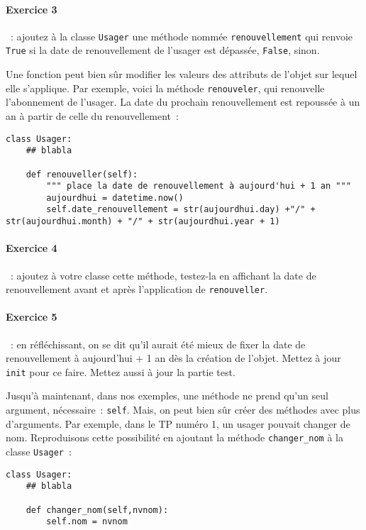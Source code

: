 \documentclass{article}
\begin{document}
\paragraph{Exercice 3}~: ajoutez à la classe \texttt{Usager} une méthode nommée \texttt{renouvellement} qui renvoie \texttt{True} si la date de renouvellement de l'usager est dépassée, \texttt{False}, sinon.

Une fonction peut bien sûr modifier les valeurs des attributs de l'objet sur lequel elle s'applique. Par exemple, voici la méthode \texttt{renouveler}, qui renouvelle l'abonnement de l'usager. La date du prochain renouvellement est repoussée à un an à partir de celle du renouvellement~: 

\begin{verbatim}
class Usager:
    ## blabla
    
    def renouveller(self):
        """ place la date de renouvellement à aujourd'hui + 1 an """
        aujourdhui = datetime.now()
        self.date_renouvellement = str(aujourdhui.day) +"/" + str(aujourdhui.month) + "/" + str(aujourdhui.year + 1)
\end{verbatim}

\paragraph{Exercice 4}~: ajoutez à votre classe cette méthode, testez-la en affichant la date de renouvellement avant et après  l'application de \texttt{renouveller}.

\paragraph{Exercice 5}~: en réfléchissant, on se dit qu'il aurait été mieux de fixer la date de renouvellement à aujourd'hui + 1 an dès la création de l'objet. Mettez à jour \texttt{init} pour ce faire. Mettez aussi à jour la partie test.

Jusqu'à maintenant, dans nos exemples, une méthode ne prend qu'un seul argument, nécessaire~: \texttt{self}. Mais, on peut bien sûr créer des méthodes avec plus d'arguments. Par exemple, dans le TP numéro 1, un usager pouvait changer de nom. Reproduisons cette possibilité en ajoutant la méthode \texttt{changer\_nom} à la classe \texttt{Usager}~:

\begin{verbatim}
class Usager:
    ## blabla

    def changer_nom(self,nvnom):
        self.nom = nvnom
\end{verbatim}
\end{document}
